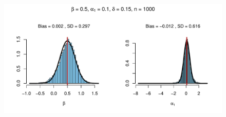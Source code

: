 \documentclass{beamer}
\begin{document}
%
%
%
%
%
\begin{frame}[plain,c]

  \begin{figure}[h]
    \centering
    \includegraphics[width=\textwidth]{Rplot9}
  \end{figure}

\end{frame}
%
%
%
%
\end{document}
